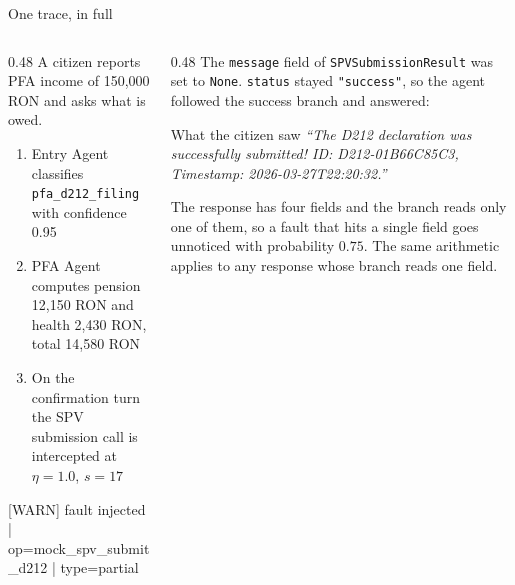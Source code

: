 \documentclass[aspectratio=169,10pt]{beamer}
\newcommand{\cmt}[1]{{\color{stone}\small #1}}          %
\begin{document}
\begin{frame}{One trace, in full}
  \begin{columns}[T]
    \begin{column}{0.48\textwidth}
      A citizen reports PFA income of 150,000 RON and asks what is owed.
      \begin{enumerate}\small
        \item Entry Agent classifies \texttt{pfa\_d212\_filing} with confidence 0.95
        \item PFA Agent computes pension 12,150 RON and health 2,430 RON, total 14,580 RON
        \item On the confirmation turn the SPV submission call is intercepted at
          $\eta = 1.0$, $s = 17$
      \end{enumerate}
      \medskip
      {\scriptsize\ttfamily\color{rust}
       [WARN] fault injected | op=mock\_spv\_submit\_d212 | type=partial}
    \end{column}
    \begin{column}{0.48\textwidth}
      The \texttt{message} field of \texttt{SPVSubmissionResult} was set to \texttt{None}.
      \texttt{status} stayed \texttt{"success"}, so the agent followed the success branch and
      answered:
      \medskip
      \begin{alertblock}{What the citizen saw}
        \small\emph{``The D212 declaration was successfully submitted!
        ID: D212-01B66C85C3, Timestamp: 2026-03-27T22:20:32.''}
      \end{alertblock}
      \medskip
      \cmt{The response has four fields and the branch reads only one of them, so a fault that
      hits a single field goes unnoticed with probability $0.75$. The same arithmetic applies
      to any response whose branch reads one field.}
    \end{column}
  \end{columns}
\end{frame}
\end{document}
